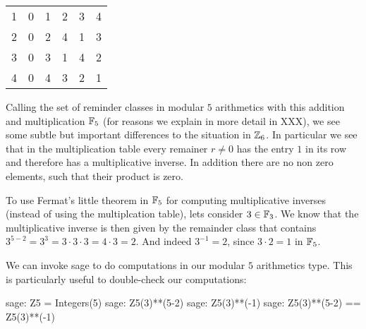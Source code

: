 \begin{example} 
\begin{center}
\begin{tabular}{c | c c c c c}
      1 & 0 & 1 & 2 & 3 & 4 \\
      2 & 0 & 2 & 4 & 1 & 3 \\
      3 & 0 & 3 & 1 & 4 & 2 \\
      4 & 0 & 4 & 3 & 2 & 1 \\
  \end{tabular}
\end{center}
Calling the set of reminder classes in modular $5$ arithmetics with this addition and multiplication $\mathbb{F}_5$ (for reasons we explain in more detail in XXX), we see some subtle but important differences to the situation in $\mathbb{Z}_6$. In particular we see that in the multiplication table every remainer $r\neq 0$ has the entry $1$ in its row and therefore has a multiplicative inverse. In addition there are no non zero elements, such that their product is zero.

To use Fermat's little theorem in $\mathbb{F}_5$ for computing multiplicative inverses (instead of using the multiplcation table), lets consider $3\in\mathbb{F}_3$. We know that the multiplicative inverse is then given by the remainder class that contains $3^{5-2}=3^3=3\cdot 3\cdot 3= 4\cdot 3 = 2$. And indeed $3^{-1}=2$, since $3\cdot 2 =1$ in $\mathbb{F}_5$.

We can invoke sage to do computations in our modular $5$ arithmetics type. This is particularly useful to double-check our computations:
\begin{sagecommandline}
sage: Z5 = Integers(5)
sage: Z5(3)**(5-2)
sage: Z5(3)**(-1)
sage: Z5(3)**(5-2) == Z5(3)**(-1)
\end{sagecommandline}
\end{example}
